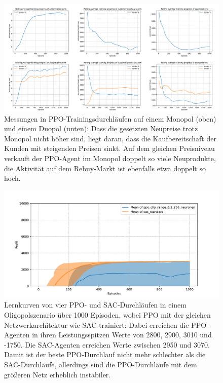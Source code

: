 \begin{figure}[htb]
	\centering
	\includegraphics[width=\textwidth]{appendix/ppo_monopoly_vs_doupoly.pdf}
	\caption{
		Messungen in PPO-Trainingsdurchläufen auf einem Monopol (oben) und einem Duopol (unten):
		Dass die gesetzten Neupreise trotz Monopol nicht höher sind, liegt daran, dass die Kaufbereitschaft der Kunden mit steigenden Preisen sinkt.
		Auf dem gleichen Preisniveau verkauft der PPO-Agent im Monopol doppelt so viele Neuprodukte, die Aktivität auf dem Rebuy-Markt ist ebenfalls etwa doppelt so hoch.
	}
	\label{graphic:PPOMonopolyDuopoly}
\end{figure}
\begin{figure}[htb]
	\centering
	\includegraphics[width=\textwidth]{appendix/comparison_oligopoly_big_network.pdf}
	\caption{
		Lernkurven von vier PPO- und SAC-Durchläufen in einem Oligopolszenario über 1000 Episoden, wobei PPO mit der gleichen Netzwerkarchitektur wie SAC trainiert:
		Dabei erreichen die PPO-Agenten in ihren Leistungsspitzen Werte von 2800{,} 2900{,} 3010 und -1750.
		Die SAC-Agenten erreichen Werte zwischen 2950 und 3070.
		Damit ist der beste PPO-Durchlauf nicht mehr schlechter als die SAC-Durchläufe, allerdings sind die PPO-Durchläufe mit dem größeren Netz erheblich instabiler.
	}
	\label{graphic:OligopolyMixedComparisonBigNetwork}
\end{figure}
